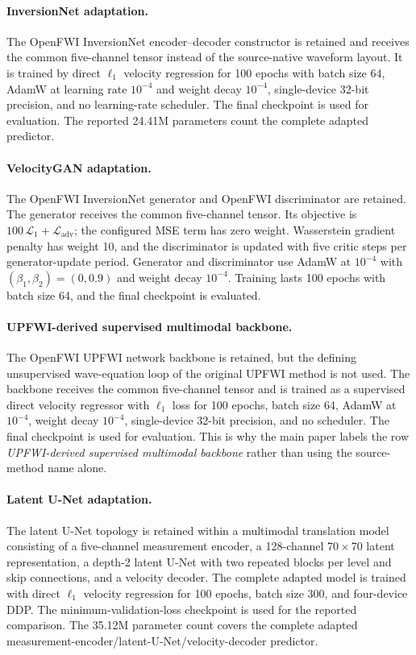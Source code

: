 \documentclass[11pt]{article}
\begin{document}
\paragraph{InversionNet adaptation.}
The OpenFWI InversionNet encoder--decoder constructor is retained and receives the common five-channel tensor instead of the source-native waveform layout. It is trained by direct $\ell_1$ velocity regression for 100 epochs with batch size 64, AdamW at learning rate $10^{-4}$ and weight decay $10^{-4}$, single-device 32-bit precision, and no learning-rate scheduler. The final checkpoint is used for evaluation. The reported 24.41M parameters count the complete adapted predictor.

\paragraph{VelocityGAN adaptation.}
The OpenFWI InversionNet generator and OpenFWI discriminator are retained. The generator receives the common five-channel tensor. Its objective is $100\,\mathcal L_1+\mathcal L_{\mathrm{adv}}$; the configured MSE term has zero weight. Wasserstein gradient penalty has weight 10, and the discriminator is updated with five critic steps per generator-update period. Generator and discriminator use AdamW at $10^{-4}$ with $(\beta_1,\beta_2)=(0,0.9)$ and weight decay $10^{-4}$. Training lasts 100 epochs with batch size 64, and the final checkpoint is evaluated.

\paragraph{UPFWI-derived supervised multimodal backbone.}
The OpenFWI UPFWI network backbone is retained, but the defining unsupervised wave-equation loop of the original UPFWI method is not used. The backbone receives the common five-channel tensor and is trained as a supervised direct velocity regressor with $\ell_1$ loss for 100 epochs, batch size 64, AdamW at $10^{-4}$, weight decay $10^{-4}$, single-device 32-bit precision, and no scheduler. The final checkpoint is used for evaluation. This is why the main paper labels the row \emph{UPFWI-derived supervised multimodal backbone} rather than using the source-method name alone.

\paragraph{Latent U-Net adaptation.}
The latent U-Net topology is retained within a multimodal translation model consisting of a five-channel measurement encoder, a 128-channel $70\times70$ latent representation, a depth-2 latent U-Net with two repeated blocks per level and skip connections, and a velocity decoder. The complete adapted model is trained with direct $\ell_1$ velocity regression for 100 epochs, batch size 300, and four-device DDP. The minimum-validation-loss checkpoint is used for the reported comparison. The 35.12M parameter count covers the complete adapted measurement-encoder/latent-U-Net/velocity-decoder predictor.
\end{document}
